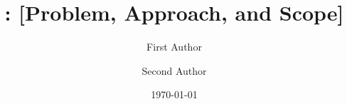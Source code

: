 \documentclass{generic_report}
\title{\CoreTerm: [Problem, Approach, and Scope]}
\author[1,*]{First Author}
\author[2,*]{Second Author}
\affiliation[1]{First Institution}
\affiliation[2]{Second Institution}
\date{\today}
\newif\ifshowcontents
\begin{document}
\label{fig:teaser}
\maketitle
\ifshowcontents
  \tableofcontents
\fi
\ReportBeginMain


\FloatBarrier

\FloatBarrier

\FloatBarrier

\FloatBarrier

\FloatBarrier




\clearpage
\onecolumn
\beginappendix

\end{document}
